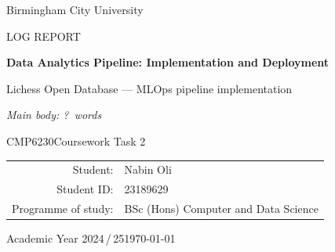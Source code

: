 \documentclass[11pt,a4paper]{article}
\title{\ReportTitle}
\author{\StudentName}
\date{\today}
\newcommand{\UniName}{Birmingham City University}
\newcommand{\StudentName}{Nabin Oli}
\newcommand{\StudentID}{23189629}
\newcommand{\DegreeName}{BSc (Hons) Computer and Data Science}
\newcommand{\ModuleCode}{CMP6230}
\newcommand{\TaskName}{Coursework Task 2}
\newcommand{\ReportTitle}{Data Analytics Pipeline: Implementation and Deployment}
\newcommand{\ReportSubtitle}{Lichess Open Database --- MLOps pipeline implementation}
\newcommand{\ReportType}{Log Report}
\newcommand{\AcademicYear}{Academic Year 2024\,/\,25}
\providecommand{\BodyWordCount}{?}%
\begin{document}
\begin{titlepage}
  \centering
  \vspace*{2cm}
  {\large \UniName\par}
  \vspace{2cm}
  {\large \MakeUppercase{\ReportType}\par}
  \vspace{1.5cm}
  {\LARGE\bfseries \ReportTitle\par}
  \vspace{0.5cm}
  {\large \ReportSubtitle\par}
  \vspace{0.35cm}
  {\normalsize\textit{Main body: \BodyWordCount\ words}\par}
  \vspace{0.35cm}
  {\large \ModuleCode\quad\textemdash\quad\TaskName\par}
  \vfill
  \begin{tabular}{rl}
    Student:            & \StudentName   \\[0.4em]
    Student ID:        & \StudentID     \\[0.4em]
    Programme of study: & \DegreeName    \\
  \end{tabular}
  \vspace{2cm}
  {\footnotesize \AcademicYear\quad\textperiodcentered\quad\today\par}
\end{titlepage}

\tableofcontents
\clearpage











\appendix


\printbibliography[heading=bibintoc,title={References}]
\end{document}
